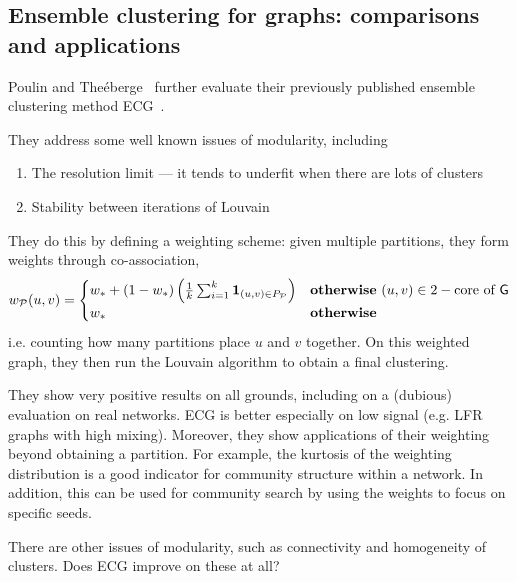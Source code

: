 \documentclass[../../main/main.tex]{subfiles}
\begin{document}
\subsection*{Ensemble clustering for graphs: comparisons and applications}

Poulin and The\'eberge~\cite{poulin19-07} further evaluate their previously published ensemble clustering method ECG~\cite{poulin18-12}.

They address some well known issues of modularity, including
\begin{enumerate}
	\item The resolution limit --- it tends to underfit when there are lots of clusters
	\item Stability between iterations of Louvain
\end{enumerate}

They do this by defining a weighting scheme: given multiple partitions, they form weights through co-association,
$$
	w_{\mathcal{P}}(u, v) =
	\begin{cases}
		w_* + (1 - w_*) \left( \frac{1}{k} \sum_{i=1}^k \mathbf{1}_{(u, v) \in P_{\mathcal{P}}} \right) & {\mathbf{otherwise}\ } (u, v) \in 2-\text{core of } \mathsf{G} \\
		w_*                                                                                             & {\mathbf{otherwise}\ }
	\end{cases}
$$
i.e. counting how many partitions place $u$ and $v$ together.
On this weighted graph, they then run the Louvain algorithm to obtain a final clustering.

They show very positive results on all grounds, including on a (dubious) evaluation on real networks.
ECG is better especially on low signal (e.g. LFR graphs with high mixing).
Moreover, they show applications of their weighting beyond obtaining a partition.
For example, the kurtosis of the weighting distribution is a good indicator for community structure within a network.
In addition, this can be used for community search by using the weights to focus on specific seeds.

There are other issues of modularity, such as connectivity and homogeneity of clusters.
Does ECG improve on these at all?

\bibsub
\end{document}
